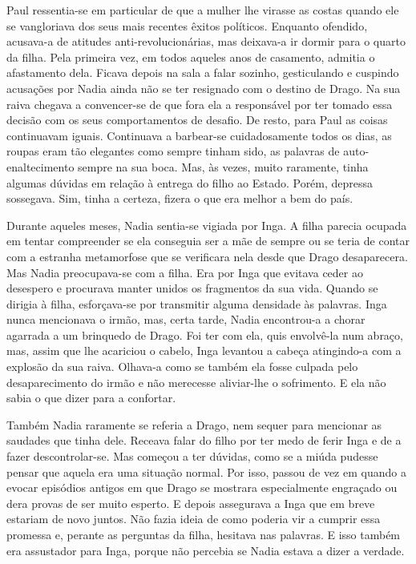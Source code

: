 Paul ressentia-se em particular de que a mulher lhe virasse as costas
quando ele se vangloriava dos seus mais recentes êxitos políticos.
Enquanto ofendido, acusava-a de atitudes anti-revolucionárias, mas
deixava-a ir dormir para o quarto da filha. Pela primeira vez, em todos
aqueles anos de casamento, admitia o afastamento dela. Ficava depois na
sala a falar sozinho, gesticulando e cuspindo acusações por Nadia ainda
não se ter resignado com o destino de Drago. Na sua raiva chegava a
convencer-se de que fora ela a responsável por ter tomado essa decisão
com os seus comportamentos de desafio. De resto, para Paul as coisas
continuavam iguais. Continuava a barbear-se cuidadosamente todos os
dias, as roupas eram tão elegantes como sempre tinham sido, as palavras
de auto-enaltecimento sempre na sua boca. Mas, às vezes, muito
raramente, tinha algumas dúvidas em relação à entrega do filho ao
Estado. Porém, depressa sossegava. Sim, tinha a certeza, fizera o que
era melhor a bem do país.

Durante aqueles meses, Nadia sentia-se vigiada por Inga. A filha parecia
ocupada em tentar compreender se ela conseguia ser a mãe de sempre ou se
teria de contar com a estranha metamorfose que se verificara nela desde
que Drago desaparecera. Mas Nadia preocupava-se com a filha. Era por
Inga que evitava ceder ao desespero e procurava manter unidos os
fragmentos da sua vida. Quando se dirigia à filha, esforçava-se por
transmitir alguma densidade às palavras. Inga nunca mencionava o
irmão, mas, certa tarde, Nadia encontrou-a a chorar agarrada a um
brinquedo de Drago. Foi ter com ela, quis envolvê-la num abraço, mas,
assim que lhe acariciou o cabelo, Inga levantou a cabeça atingindo-a
com a explosão da sua raiva. Olhava-a como se também ela fosse culpada
pelo desaparecimento do irmão e não merecesse aliviar-lhe o sofrimento. E ela não sabia o que dizer para a confortar.

Também Nadia raramente se referia a Drago, nem
sequer para mencionar as saudades que tinha dele. Receava falar do filho
por ter medo de ferir Inga e de a fazer descontrolar-se. Mas começou a
ter dúvidas, como se a miúda pudesse pensar que aquela era uma situação
normal. Por isso, passou de vez em quando a evocar episódios
antigos em que Drago se mostrara especialmente engraçado ou dera
provas de ser muito esperto. E depois assegurava a Inga que em breve
estariam de novo juntos. Não fazia ideia de como poderia vir a cumprir
essa promessa e, perante as perguntas da filha, hesitava nas palavras. E
isso também era assustador para Inga, porque não percebia se Nadia
estava a dizer a verdade.

